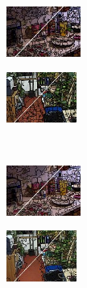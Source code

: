 \begin{figure}
	\begin{subfigure}[b]{0.1375\textwidth}
		\includegraphics[height=1.65cm]{pictures/nyuv2/lsc/cropped/lsc_00000561_contours}
	\end{subfigure}
	\begin{subfigure}[b]{0.129\textwidth}
		\includegraphics[height=1.65cm]{pictures/sunrgbd/lsc/cropped/lsc_00004732_contours}
	\end{subfigure}\\
	\begin{subfigure}[b]{0.02\textwidth}
	\end{subfigure}
	\begin{subfigure}[b]{0.1375\textwidth}
		\includegraphics[height=1.65cm]{pictures/nyuv2/poise/cropped/poise_00000561_contours}
	\end{subfigure}
	\begin{subfigure}[b]{0.129\textwidth}
		\includegraphics[height=1.65cm]{pictures/sunrgbd/poise/cropped/poise_00004732_contours}
	\end{subfigure}
	\begin{subfigure}[b]{0.02\textwidth}
		\hphantom{aa}
	\end{subfigure}
	\begin{subfigure}[b]{0.1375\textwidth}
		\hphantom{aaaaaaaaaaaaaaaaaaaaaaaaaaaaaii}
	\end{subfigure}
	\begin{subfigure}[b]{0.129\textwidth}
		\hphantom{aaaaaaaaaaaaaaaaaaaaaaaaaaa}
	\end{subfigure}

\end{figure}
